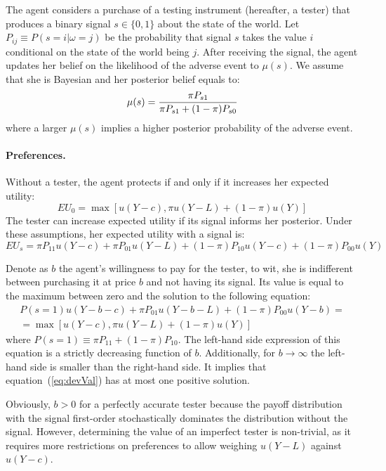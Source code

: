 \documentclass[12pt,a4paper]{article}
\begin{document}
The agent considers a purchase of a testing instrument (hereafter, a tester) that produces a binary signal $s\in\{0,1\}$ about the state of the world. Let $P_{ij}\equiv P(s=i|\omega=j)$ be the probability that signal $s$ takes the value $i$ conditional on the state of the world being $j$.  After receiving the signal, the agent updates her belief on the likelihood of the adverse event to $\mu(s)$. We assume that she is Bayesian and her posterior belief equals to:
\[
\mu(s)= {\pi P_{s1} \over \pi P_{s1}+(1-\pi)P_{s0}}
\]
where a larger $\mu(s)$ implies a higher posterior probability of the adverse event.

\vspace{10pt}
\paragraph{Preferences.} Without a tester, the agent protects if and only if it increases her expected utility:
\[
EU_0=\max[u(Y-c),\pi u(Y-L)+(1-\pi) u(Y)]
\]
The tester can increase expected utility if its signal informs her posterior. Under these assumptions, her expected utility with a signal is:
\[
EU_s=\pi P_{11}u(Y-c)+\pi P_{01}u(Y-L)+(1-\pi)P_{10}u(Y-c)+(1-\pi)P_{00}u(Y)
\]

Denote as $b$ the agent's willingness to pay for the tester, to wit, she is indifferent between purchasing it at price $b$ and not having its signal. Its value is equal to the maximum between zero and the solution to the following equation:
\begin{equation}\label{eq:devVal}
\begin{split}
P(s=1)u(Y-b-c)+\pi P_{01}u(Y-b-L)+(1-\pi)P_{00}u(Y-b)=\\=\max[u(Y-c),\pi u(Y-L)+(1-\pi) u(Y)] 
\end{split}
\end{equation}
where $P(s=1)\equiv \pi P_{11}+(1-\pi)P_{10}$. The left-hand side expression of this equation is a strictly decreasing function of $b$. Additionally, for $b\rightarrow \infty$ the left-hand side is smaller than the right-hand side. It implies that equation~(\ref{eq:devVal}) has at most one positive solution.

Obviously, $b>0$ for a perfectly accurate tester because the payoff distribution with the signal first-order stochastically dominates the distribution without the signal. 
However, determining the value of an imperfect tester is non-trivial, as it requires more restrictions on preferences to allow weighing $u(Y-L)$ against $u(Y-c)$.
\end{document}
